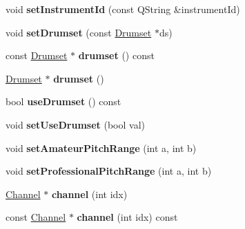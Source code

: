 \begin{DoxyCompactItemize}
\item 
\mbox{\label{class_ms_1_1_instrument_a0422ca02ce2b78387f5a31dc74bb4bca}} 
void {\bfseries set\+Instrument\+Id} (const Q\+String \&instrument\+Id)
\item 
\mbox{\label{class_ms_1_1_instrument_a8d1568b455350500327acd25dfd89e9a}} 
void {\bfseries set\+Drumset} (const \hyperlink{class_ms_1_1_drumset}{Drumset} $\ast$ds)
\item 
\mbox{\label{class_ms_1_1_instrument_ac377dcee9176d06151474454b0f3c265}} 
const \hyperlink{class_ms_1_1_drumset}{Drumset} $\ast$ {\bfseries drumset} () const
\item 
\mbox{\label{class_ms_1_1_instrument_a3a0e52aa4b075f5bdc9510f8306c95bf}} 
\hyperlink{class_ms_1_1_drumset}{Drumset} $\ast$ {\bfseries drumset} ()
\item 
\mbox{\label{class_ms_1_1_instrument_a1632d4bf3af6b96e024ae13be290099d}} 
bool {\bfseries use\+Drumset} () const
\item 
\mbox{\label{class_ms_1_1_instrument_a1de09574c7bb06120e1d7515fe01da4b}} 
void {\bfseries set\+Use\+Drumset} (bool val)
\item 
\mbox{\label{class_ms_1_1_instrument_aedea38a9f0a91615e42f5ed1d7f5399d}} 
void {\bfseries set\+Amateur\+Pitch\+Range} (int a, int b)
\item 
\mbox{\label{class_ms_1_1_instrument_a91946d203c2bc1a2e0ca3fd5e82ce5f0}} 
void {\bfseries set\+Professional\+Pitch\+Range} (int a, int b)
\item 
\mbox{\label{class_ms_1_1_instrument_aa4f0203241ae16e4b0b036a17758a00a}} 
\hyperlink{struct_ms_1_1_channel}{Channel} $\ast$ {\bfseries channel} (int idx)
\item 
\mbox{\label{class_ms_1_1_instrument_ac12e47a107a3ef2d95757d99c0967411}} 
const \hyperlink{struct_ms_1_1_channel}{Channel} $\ast$ {\bfseries channel} (int idx) const

\end{DoxyCompactItemize}
